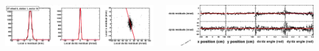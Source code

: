 \documentclass[compress]{beamer}
\begin{document}
\begin{frame}
\begin{columns}
\vspace{0.5 cm}
\includegraphics[width=\linewidth]{samplefits.png}

\includegraphics[width=\linewidth]{samplefits2.png}
\end{columns}
\end{frame}
\end{document}
